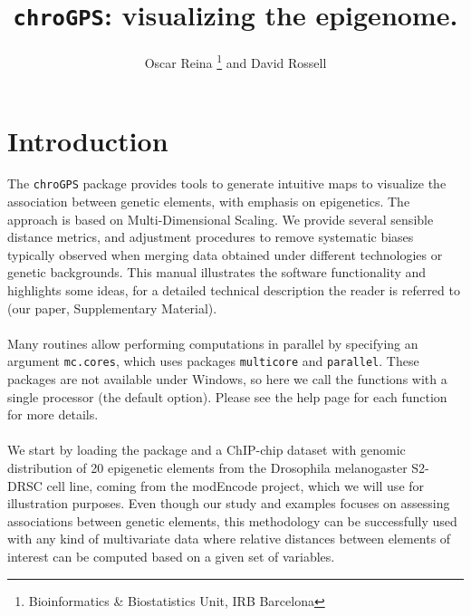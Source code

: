 \documentclass[a4paper,12pt,nogin]{article}
\newcommand{\newtext}[1]{{\color{blue} #1}} %
\begin{document}
\title{\texttt{chroGPS}: visualizing the epigenome. }
\small
\author{Oscar Reina \footnote{Bioinformatics \& Biostatistics Unit,
    IRB Barcelona}  and David Rossell
  \footnotemark[1] }
\normalsize
\date{}  %

\maketitle


\section{Introduction}
\label{sec:intro}

The \texttt{chroGPS} package provides tools to generate intuitive maps to visualize the association between genetic elements, with emphasis on epigenetics. The approach is based on Multi-Dimensional Scaling. We provide several sensible distance metrics, and adjustment procedures to remove systematic biases typically observed when merging data obtained under different technologies or genetic backgrounds.
\newtext{This manual illustrates the software functionality and highlights some ideas,
for a detailed technical description the reader is referred to (our paper, Supplementary Material).}
\\\\
Many routines allow performing computations in parallel 
by specifying an argument \texttt{mc.cores}, which uses
packages \texttt{multicore} \newtext{and \texttt{parallel}.
These packages are not available under Windows, so here we call the functions with a single processor (the default option).}
Please see the help page for each function for more details.
\\\\
We start by loading the package and a ChIP-chip dataset with genomic
distribution of 20 epigenetic elements from the Drosophila melanogaster
S2-DRSC cell line, coming from the modEncode project, which we will use for illustration purposes.
Even though our study and examples focuses on assessing associations
between genetic elements, this methodology can be successfully used with
any kind of multivariate data where relative distances between
elements of interest can be computed based on a given set of variables.
\end{document}

